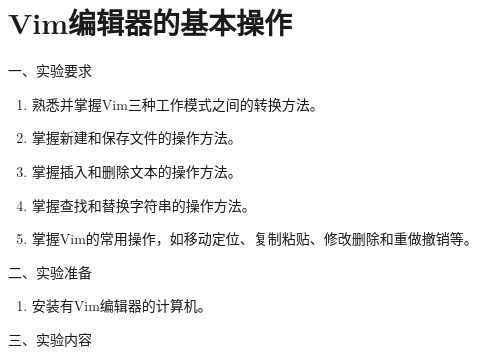 \chapter{Vim编辑器的基本操作}

\noindent
一、实验要求
\begin{enumerate}
  \item 熟悉并掌握Vim三种工作模式之间的转换方法。
  \item 掌握新建和保存文件的操作方法。
  \item 掌握插入和删除文本的操作方法。
  \item 掌握查找和替换字符串的操作方法。
  \item 掌握Vim的常用操作，如移动定位、复制粘贴、修改删除和重做撤销等。
\end{enumerate}

\vspace{0.2in}
\noindent
二、实验准备
\begin{enumerate}
  \item 安装有Vim编辑器的计算机。
\end{enumerate}

\vspace{0.2in}
\noindent
三、实验内容

